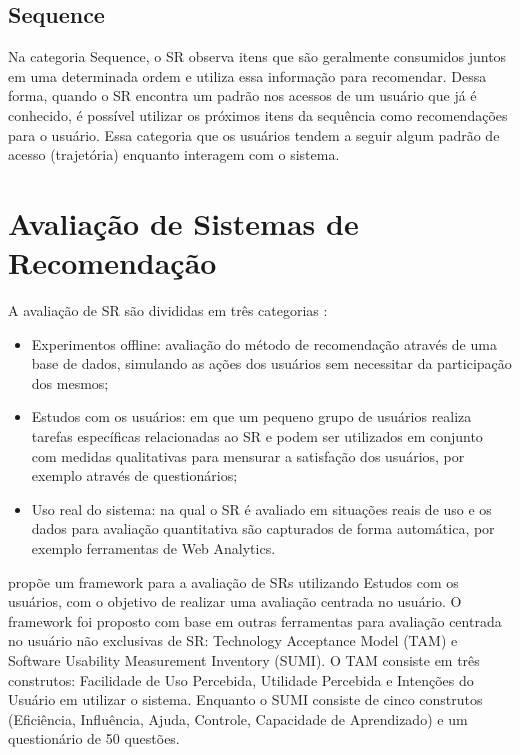 \subsection{Sequence}

Na categoria Sequence, o SR observa itens que são geralmente consumidos juntos em uma determinada ordem e utiliza essa
informação para recomendar. Dessa forma, quando o SR encontra um padrão nos acessos de um usuário que já é conhecido,
é possível utilizar os próximos itens da sequência como recomendações para o usuário. Essa categoria que os usuários
tendem a seguir algum padrão de acesso (trajetória) enquanto interagem com o sistema.

\section{Avaliação de Sistemas de Recomendação}

A avaliação de SR são divididas em três categorias \cite{shani2011evaluating}:

\begin{itemize}
\item Experimentos offline: avaliação do método de recomendação através de uma base de dados, simulando as ações dos
usuários sem necessitar da participação dos mesmos;
\item Estudos com os usuários: em que um pequeno grupo de usuários realiza tarefas específicas relacionadas ao SR e
podem ser utilizados em conjunto com medidas qualitativas para mensurar a satisfação dos usuários, por exemplo através
de questionários;
\item Uso real do sistema: na qual o SR é avaliado em situações reais de uso e os dados para avaliação quantitativa são
capturados de forma automática, por exemplo ferramentas de Web Analytics.
\end{itemize}

 propõe um framework para a avaliação de SRs utilizando Estudos com os usuários, com o objetivo
de realizar uma avaliação centrada no usuário. O framework foi proposto com base em outras ferramentas para avaliação
centrada no usuário não exclusivas de SR: Technology Acceptance Model (TAM) e Software Usability Measurement Inventory
(SUMI). O TAM consiste em três construtos: Facilidade de Uso Percebida, Utilidade Percebida e Intenções do Usuário em
utilizar o sistema. Enquanto o SUMI consiste de cinco construtos (Eficiência, Influência, Ajuda, Controle, Capacidade
de Aprendizado) e um questionário de 50 questões.

